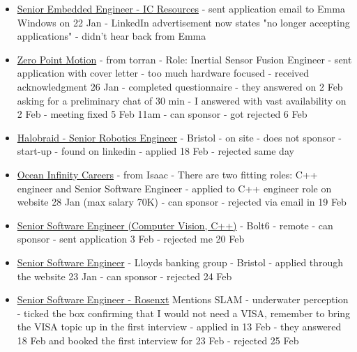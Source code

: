 \begin{itemize}
\item
    \href{https://www.linkedin.com/jobs/view/senior-embedded-engineer-at-ic-resources-4267258654/}
    {Senior Embedded Engineer - IC Resources} - sent application email to Emma Windows
    on 22 Jan - LinkedIn advertisement now states "no longer accepting
    applications" - didn't hear back from Emma
\item
    \href{https://www.zeropointmotion.com/}{Zero Point Motion} - from torran
    - Role: Inertial Sensor Fusion Engineer - sent application with cover letter
    - too much hardware focused - received acknowledgment 26 Jan - completed
    questionnaire - they answered on 2 Feb asking for a preliminary chat of 30
    min - I answered with vast availability on 2 Feb - meeting fixed 5 Feb 11am
    - can sponsor - got rejected 6 Feb
\item
  \href{https://jobs.ashbyhq.com/halobraid/95990f9c-2f0f-4b78-ba62-b7dfbd1c0283?utm_source=Linkedin_Man_UK_Robotics}
    {Halobraid - Senior Robotics Engineer} - Bristol - on site - does not
    sponsor - start-up - found on linkedin - applied 18 Feb - rejected same day
\item
    \href{https://wd1.myworkdaysite.com/en-US/recruiting/oceaninfinity/ocean_infinity_careers/}
    {Ocean Infinity Careers}
    - from Isaac - There are two fitting roles: C++ engineer and Senior
    Software Engineer - applied to C++ engineer role on website 28 Jan (max
    salary 70K) - can sponsor - rejected via email in 19 Feb
\item
    \href{https://bolt6.bamboohr.com/careers/25}{Senior Software Engineer
    (Computer Vision, C++)} - Bolt6 - remote - can sponsor - sent application 3
    Feb - rejected me 20 Feb
\item
    \href{https://www.lloydsbankinggroup.com/careers/job-search/workday-job.146310.html?utm_campaign=google_jobs_apply&utm_source=google_jobs_apply&utm_medium=organic}
    {Senior Software Engineer} - Lloyds banking group  - Bristol
    - applied through the website 23 Jan - can sponsor - rejected 24 Feb
\item
  \href{https://rosennxt.wd103.myworkdayjobs.com/rosenxt/job/bristol/senior-software-engineer_jr100866}
    {Senior Software Engineer - Rosenxt} Mentions SLAM - underwater perception -
    ticked the box confirming that I would not need a VISA, remember to bring the VISA topic
    up in the first interview - applied in 13 Feb - they answered 18 Feb and
    booked the first interview for 23 Feb - rejected 25 Feb

\end{itemize}
